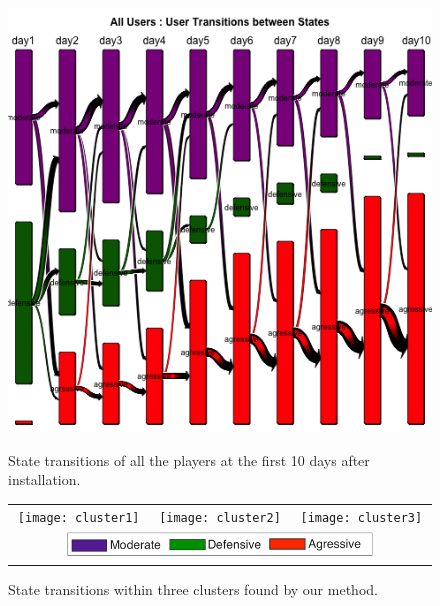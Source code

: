 \begin{figure}[h]
\begin{minipage}[b]{0.28\linewidth}
    \centering
    \includegraphics[width=0.85\linewidth]{transitions} 
    \caption{State transitions of all the players at the first 10 days after installation.}
    \label{fig:transitions}
\end{minipage}
\quad
\begin{minipage}[b]{0.65\linewidth}
    \centering
        \begin{tabular}{ccc}
         \texttt{[image: cluster1]} &
         \texttt{[image: cluster2]} &
         \texttt{[image: cluster3]} \\
         \multicolumn{3}{c}{ \includegraphics[width=0.75\textwidth]{legend} }
         \end{tabular}
     \caption{\label{fig:clusters} State transitions within three clusters found by our method.}
\end{minipage}
\end{figure}

%


